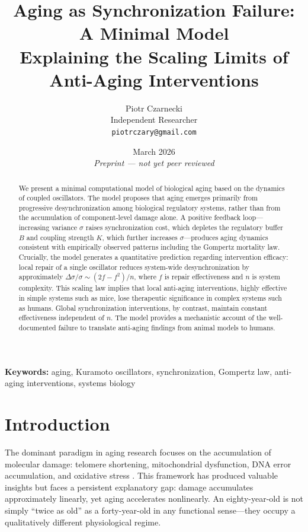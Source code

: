 \documentclass[12pt]{article}
\title{\textbf{Aging as Synchronization Failure: A Minimal Model\\
Explaining the Scaling Limits of Anti-Aging Interventions}}
\author{
  Piotr Czarnecki\\
  \small Independent Researcher\\
  \small \texttt{piotrczary@gmail.com}
}
\date{March 2026 \\ \vspace{0.5em}
  \small\textit{Preprint — not yet peer reviewed}}
\begin{document}
\maketitle

\begin{abstract}
We present a minimal computational model of biological aging based on the
dynamics of coupled oscillators. The model proposes that aging emerges primarily
from progressive desynchronization among biological regulatory systems, rather
than from the accumulation of component-level damage alone. A positive feedback
loop---increasing variance $\sigma$ raises synchronization cost, which depletes
the regulatory buffer $B$ and coupling strength $K$, which further increases
$\sigma$---produces aging dynamics consistent with empirically observed patterns
including the Gompertz mortality law. Crucially, the model generates a
quantitative prediction regarding intervention efficacy: local repair of a single
oscillator reduces system-wide desynchronization by approximately
$\Delta\sigma/\sigma \sim (2f-f^2)/n$, where $f$ is repair effectiveness and $n$ is
system complexity. This scaling law implies that local anti-aging interventions,
highly effective in simple systems such as mice, lose therapeutic significance in
complex systems such as humans. Global synchronization interventions, by
contrast, maintain constant effectiveness independent of $n$. The model provides
a mechanistic account of the well-documented failure to translate anti-aging
findings from animal models to humans.
\end{abstract}

\textbf{Keywords:} aging, Kuramoto oscillators, synchronization, Gompertz law,
anti-aging interventions, systems biology

\newpage

\section{Introduction}

The dominant paradigm in aging research focuses on the accumulation of molecular
damage: telomere shortening, mitochondrial dysfunction, DNA error accumulation,
and oxidative stress \citep{lopez2023hallmarks}. This framework has produced
valuable insights but faces a persistent explanatory gap: damage accumulates
approximately linearly, yet aging accelerates nonlinearly. An eighty-year-old is
not simply ``twice as old'' as a forty-year-old in any functional sense---they
occupy a qualitatively different physiological regime.
\end{document}
